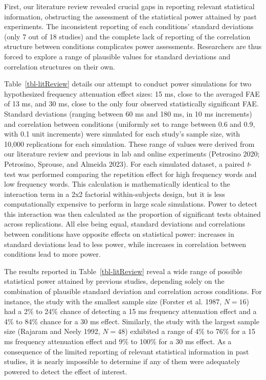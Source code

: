 \documentclass[
]{interact}
\begin{document}
First, our literature review revealed crucial gaps in reporting relevant
statistical information, obstructing the assessment of the statistical
power attained by past experiments. The inconsistent reporting of each
conditions' standard deviations (only 7 out of 18 studies) and the
complete lack of reporting of the correlation structure between
conditions complicates power assessments. Researchers are thus forced to
explore a range of plausible values for standard deviations and
correlation structures on their own.

Table~\ref{tbl-litReview} details our attempt to conduct power
simulations for two hypothesized frequency attenuation effect sizes: 15
ms, close to the averaged FAE of 13 ms, and 30 ms, close to the only
four observed statistically significant FAE. Standard deviations
(ranging between 60 ms and 180 ms, in 10 ms increments) and correlation
between conditions (uniformly set to range between 0.6 and 0.9, with 0.1
unit increments) were simulated for each study's sample size, with
10,000 replications for each simulation. These range of values were
derived from our literature review and previous in lab and online
experiments (Petrosino 2020; Petrosino, Sprouse, and Almeida 2023). For
each simulated dataset, a paired \emph{t}-test was performed comparing
the repetition effect for high frequency words and low frequency words.
This calculation is mathematically identical to the interaction term in
a 2x2 factorial within-subjects design, but it is less computationally
expensive to perform in large scale simulations. Power to detect this
interaction was then calculated as the proportion of significant tests
obtained across replications. All else being equal, standard deviations
and correlations between conditions have opposite effects on statistical
power: increases in standard deviations lead to less power, while
increases in correlation between conditions lead to more power.

The results reported in Table~\ref{tbl-litReview} reveal a wide range of
possible statistical power attained by previous studies, depending
solely on the combination of plausible standard deviation and
correlation across conditions. For instance, the study with the smallest
sample size (Forster et al. 1987, \(N=16\)) had a 2\% to 24\% chance of
detecting a 15 ms frequency attenuation effect and a 4\% to 84\% chance
for a 30 ms effect. Similarly, the study with the largest sample size
(Rajaram and Neely 1992, \(N=48\)) exhibited a range of 4\% to 76\% for
a 15 ms frequency attenuation effect and 9\% to 100\% for a 30 ms
effect. As a consequence of the limited reporting of relevant
statistical information in past studies, it is nearly impossible to
determine if any of them were adequately powered to detect the effect of
interest.
\end{document}
